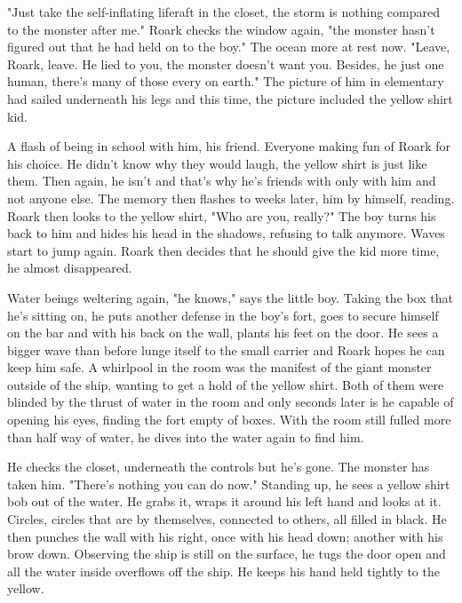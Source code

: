         "Just take the self-inflating liferaft in the closet, the storm is nothing compared to the monster after me." Roark checks the window 
    again, "the monster hasn't figured out that he had held on to the boy." The ocean more at rest now. "Leave, Roark, leave. He lied to you,
    the monster doesn't want you. Besides, he just one human, there's many of those every on earth." The picture of him in elementary had
    sailed underneath his legs and this time, the picture included the yellow shirt kid.

        A flash of being in school with him, his friend. Everyone making fun of Roark for his choice. He didn't know why they would laugh, the
    yellow shirt is just like them. Then again, he isn't and that's why he's friends with only with him and not anyone else. The memory then
    flashes to weeks later, him by himself, reading. Roark then looks to the yellow shirt, "Who are you, really?" The boy turns his back to
    him and hides his head in the shadows, refusing to talk anymore. Waves start to jump again. Roark then decides that he should give the
    kid more time, he almost disappeared.

        Water beings weltering again, "he knows," says the little boy. Taking the box that he's sitting on, he puts another defense in the
    boy's fort, goes to secure himself on the bar and with his back on the wall, plants his feet on the door. He sees a bigger wave than before
    lunge itself to the small carrier and Roark hopes he can keep him safe. A whirlpool in the room was the manifest of the giant monster outside
    of the ship, wanting to get a hold of the yellow shirt. Both of them were blinded by the thrust of water in the room and only seconds later
    is he capable of opening his eyes, finding the fort empty of boxes. With the room still fulled more than half way of water, he dives into
    the water again to find him.

        He checks the closet, underneath the controls but he's gone. The monster has taken him. "There's nothing you can do now." Standing up,
    he sees a yellow shirt bob out of the water. He grabs it, wraps it around his left hand and looks at it. Circles, circles that are by
    themselves, connected to others, all filled in black. He then punches the wall with his right, once with his head down; another with his
    brow down. Observing the ship is still on the surface, he tugs the door open and all the water inside overflows off the ship. He keeps his
    hand held tightly to the yellow.

